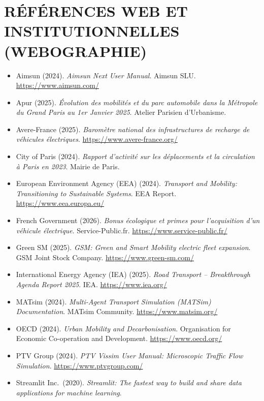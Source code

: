 \documentclass[10pt, a4paper]{article}
\providecommand{\tightlist}{}
\begin{document}
\newpage

\section{RÉFÉRENCES WEB ET INSTITUTIONNELLES
(WEBOGRAPHIE)}\label{ruxe9fuxe9rences-web-et-institutionnelles-webographie}

\begin{itemize}
\tightlist
\item
  Aimsun (2024). \emph{Aimsun Next User Manual}. Aimsun SLU.
  \url{https://www.aimsun.com/}
\item
  Apur (2025). \emph{Évolution des mobilités et du parc automobile dans
  la Métropole du Grand Paris au 1er Janvier 2025}. Atelier Parisien
  d'Urbanisme.
\item
  Avere-France (2025). \emph{Baromètre national des infrastructures de
  recharge de véhicules électriques}.
  \url{https://www.avere-france.org/}
\item
  City of Paris (2024). \emph{Rapport d'activité sur les déplacements et
  la circulation à Paris en 2023}. Mairie de Paris.
\item
  European Environment Agency (EEA) (2024). \emph{Transport and
  Mobility: Transitioning to Sustainable Systems}. EEA Report.
  \url{https://www.eea.europa.eu/}
\item
  French Government (2026). \emph{Bonus écologique et primes pour
  l'acquisition d'un véhicule électrique}. Service-Public.fr.
  \url{https://www.service-public.fr/}
\item
  Green SM (2025). \emph{GSM: Green and Smart Mobility electric fleet
  expansion}. GSM Joint Stock Company. \url{https://www.green-sm.com/}
\item
  International Energy Agency (IEA) (2025). \emph{Road Transport --
  Breakthrough Agenda Report 2025}. IEA. \url{https://www.iea.org/}
\item
  MATsim (2024). \emph{Multi-Agent Transport Simulation (MATSim)
  Documentation}. MATsim Community. \url{https://www.matsim.org/}
\item
  OECD (2024). \emph{Urban Mobility and Decarbonisation}. Organisation
  for Economic Co-operation and Development. \url{https://www.oecd.org/}
\item
  PTV Group (2024). \emph{PTV Vissim User Manual: Microscopic Traffic
  Flow Simulation}. \url{https://www.ptvgroup.com/}
\item
  Streamlit Inc.~(2020). \emph{Streamlit: The fastest way to build and
  share data applications for machine learning}.

\end{itemize}
\end{document}
